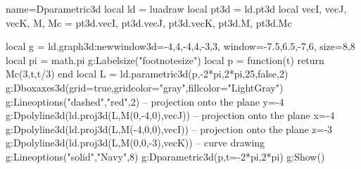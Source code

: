 \begin{luadraw}{name=Dparametric3d}
local ld = luadraw
local pt3d = ld.pt3d
local vecI, vecJ, vecK, M, Mc = pt3d.vecI, pt3d.vecJ, pt3d.vecK, pt3d.M, pt3d.Mc

local g = ld.graph3d:new{window3d={-4,4,-4,4,-3,3}, window={-7.5,6.5,-7,6}, size={8,8}}
local pi = math.pi
g:Labelsize("footnotesize")
local p = function(t) return Mc(3,t,t/3) end
local L = ld.parametric3d(p,-2*pi,2*pi,25,false,2)
g:Dboxaxes3d({grid=true,gridcolor="gray",fillcolor="LightGray"})
g:Lineoptions("dashed","red",2)
-- projection onto the plane y=-4
g:Dpolyline3d(ld.proj3d(L,{M(0,-4,0),vecJ}))
-- projection onto the plane x=-4
g:Dpolyline3d(ld.proj3d(L,{M(-4,0,0),vecI}))
-- projection onto the plane z=-3
g:Dpolyline3d(ld.proj3d(L,{M(0,0,-3),vecK}))
-- curve drawing
g:Lineoptions("solid","Navy",8)
g:Dparametric3d(p,{t={-2*pi,2*pi}})
g:Show()
\end{luadraw}
